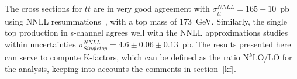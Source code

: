 The cross sections for $t\bar{t}$ are in very good agreement with 
$\sigma^{NNLL}_{t\bar{t}} = 165 \pm 10$~pb using NNLL 
resummations~\cite{nnllttbar}, with a top mass of $173$~GeV. Similarly, the 
single top production in s-channel agrees well with the NNLL approximations 
studies~\cite{nnllschannel} within uncertainties 
$\sigma^{NNLL}_{Single top} = 4.6 \pm 0.06 \pm 0.13$~pb. The results presented 
here can serve to compute K-factors, which can be defined as the ratio 
N$^k$LO/LO for the analysis, keeping into accounts the comments in section~\ref{kf}.

